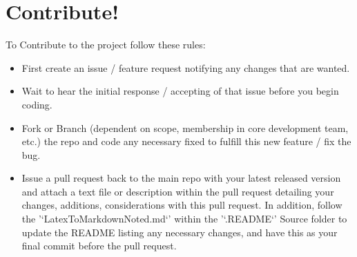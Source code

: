 \documentclass{article}
\begin{document}
\section{Contribute!}
To Contribute to the project follow these rules:
\begin{itemize}
    \item First create an issue / feature request notifying any changes that are wanted.
    \item Wait to hear the initial response / accepting of that issue before you begin coding.
    \item Fork or Branch (dependent on scope, membership in core development team, etc.) the repo and code any necessary fixed to fulfill this new feature / fix the bug.
    \item Issue a pull request back to the main repo with your latest released version and attach a text file or description within the pull request detailing your changes, additions, considerations with this pull request. In addition, follow the '`LatexToMarkdownNoted.md`' within the '`.README`' Source folder to update the README listing any necessary changes, and have this as your final commit before the pull request.
\end{itemize}
\end{document}

